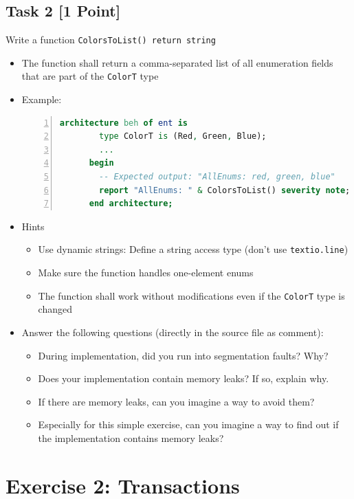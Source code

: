 \documentclass[12pt,epsf,makeidx,oneside]{book}
\begin{document}
\subsection{Task 2 [1 Point]}
   Write a function {\tt ColorsToList() return string}
  \begin{itemize}[noitemsep]
    \item The function shall return a comma-separated list of all enumeration fields that are part of the {\tt ColorT} type
    \item Example:
    \begin{lstlisting}[language=VHDL,gobble=4,numbers=left]
      architecture beh of ent is
        type ColorT is (Red, Green, Blue);
        ...
      begin
        -- Expected output: "AllEnums: red, green, blue"
        report "AllEnums: " & ColorsToList() severity note; 
      end architecture;
    \end{lstlisting}
    \item Hints
    \begin{itemize}[noitemsep]
      \item Use dynamic strings: Define a string access type (don't use {\tt textio.line})
      \item Make sure the function handles one-element enums
      \item The function shall work without modifications even if the {\tt ColorT} type is changed
    \end{itemize}
    \item Answer the following questions (directly in the source file as comment):
    \begin{itemize}[noitemsep]
      \item During implementation, did you run into segmentation faults? Why?
      \item Does your implementation contain memory leaks? If so, explain why.
      \item If there are memory leaks, can you imagine a way to avoid them?
      \item Especially for this simple exercise, can you imagine a way to find out if the implementation contains memory leaks?
    \end{itemize}
  \end{itemize}

\section{Exercise 2: Transactions}
\end{document}
